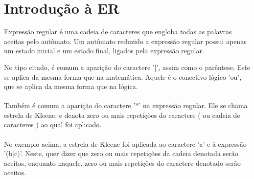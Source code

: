\documentclass[a4paper,10pt]{article} %
\begin{document}
\section{Introdução à ER}

    Expressão regular é uma cadeia de caracteres que engloba todas as palavras aceitas pelo autômato. Um autômato reduzido a expressão regular possui apenas um estado inicial e um estado final, ligados pela expressão regular.
\begin{center}
\end{center}

    No tipo citado, é comum a aparição do caractere '|', assim como o parêntese. Este se aplica da mesma forma que na matemática. Aquele é o conectivo lógico 'ou', que se aplica da mesma forma que na lógica.\\\\Também é comum a aparição do caractere '*' na expressão regular. Ele se chama estrela de Kleene, e denota zero ou mais repetições do caractere ( ou cadeia de caracteres ) ao qual foi aplicado.\\\\No exemplo acima, a estrela de Kleene foi aplicada ao caractere 'a' e à expressão '(b|c)'. Neste, quer dizer que zero ou mais repetições da cadeia denotada serão aceitas, enquanto naquele, zero ou mais repetições do caractere denotado serão aceitos.
\end{document}
